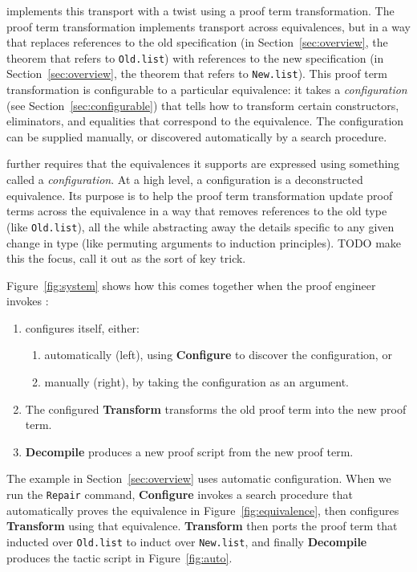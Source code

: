 \toolname implements this transport with a twist using a proof term transformation.
The proof term transformation implements transport across equivalences,
but in a way that replaces references to the old specification (in Section~\ref{sec:overview}, the theorem that refers to \lstinline{Old.list})
with references to the new specification (in Section~\ref{sec:overview}, the theorem that refers to \lstinline{New.list}).
This proof term transformation is configurable to a particular equivalence:
it takes a \textit{configuration} (see Section~\ref{sec:configurable}) 
that tells \toolname how to transform certain constructors, eliminators, and equalities that 
correspond to the equivalence.
The configuration can be supplied manually, or discovered automatically by a search procedure.

\toolname further requires that the equivalences it supports are expressed using something called a \textit{configuration}.
At a high level, a configuration is a deconstructed equivalence.
Its purpose is to help the proof term transformation update proof terms across the equivalence in a way that removes
references to the old type (like \lstinline{Old.list}), all the while abstracting away the details specific to any given change in type
(like permuting arguments to induction principles).
TODO make this the focus, call it out as the sort of key trick.

Figure~\ref{fig:system} shows how this comes together when the proof engineer invokes \toolname:

\begin{enumerate}
\item \toolname configures itself, either:
\begin{enumerate}
\item automatically (left), using \textbf{Configure} to discover the configuration, or
\item manually (right), by taking the configuration as an argument.
\end{enumerate}
\item The configured \textbf{Transform} transforms the old proof term into the new proof term.
\item \textbf{Decompile} produces a new proof script from the new proof term.
\end{enumerate}

The example in Section~\ref{sec:overview} uses automatic configuration. When we run the \lstinline{Repair} command,
\textbf{Configure} invokes a search procedure that automatically proves the equivalence in Figure~\ref{fig:equivalence},
then configures \textbf{Transform} using that equivalence.
\textbf{Transform} then ports the proof term that inducted over \lstinline{Old.list}
to induct over \lstinline{New.list}, and finally
\textbf{Decompile} produces the tactic script in Figure~\ref{fig:auto}.

